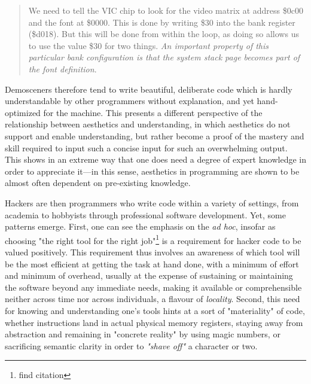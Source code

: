 \begin{quote}
  We need to tell the VIC chip to look for the video matrix at address \$0c00 and the font at \$0000. This is done by writing \$30 into the bank register (\$d018). But this will be done from within the loop, as doing so allows us to use the value \$30 for two things. \emph{An important property of this particular bank configuration is that the system stack page becomes part of the font definition}.
\end{quote}

Demosceners therefore tend to write beautiful, deliberate code which is hardly understandable by other programmers without explanation, and yet hand-optimized for the machine. This presents a different perspective of the relationship between aesthetics and understanding, in which aesthetics do not support and enable understanding, but rather become a proof of the mastery and skill required to input such a concise input for such an overwhelming output. This shows in an extreme way that one does need a degree of expert knowledge in order to appreciate it—in this sense, aesthetics in programming are shown to be almost often dependent on pre-existing knowledge. 

\vspace*{1\baselineskip}

Hackers are then programmers who write code within a variety of settings, from academia to hobbyists through professional software development. Yet, some patterns emerge. First, one can see the emphasis on the \emph{ad hoc}, insofar as choosing "the right tool for the right job"\footnote{find citation} is a requirement for hacker code to be valued positively. This requirement thus involves an awareness of which tool will be the most efficient at getting the task at hand done, with a minimum of effort and minimum of overhead, usually at the expense of sustaining or maintaining the software beyond any immediate needs, making it available or comprehensible neither across time nor across individuals, a flavour of \emph{locality}. Second, this need for knowing and understanding one's tools hints at a sort of "materiality" of code, whether instructions land in actual physical memory registers, staying away from abstraction and remaining in "concrete reality" by using magic numbers, or sacrificing semantic clarity in order to \emph{"shave off"} a character or two.

